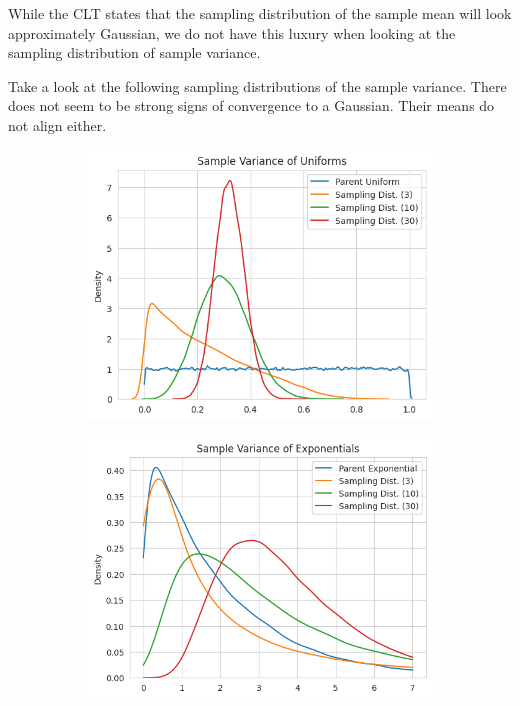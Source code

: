   While the CLT states that the sampling distribution of the sample mean will look approximately Gaussian, we do not have this luxury when looking at the sampling distribution of sample variance. 

  \begin{example}
    Take a look at the following sampling distributions of the sample variance. There does not seem to be strong signs of convergence to a Gaussian. Their means do not align either. 
    \begin{figure}[H]
      \centering
      \begin{subfigure}[b]{0.48\textwidth}
      \centering
        \includegraphics[width=\textwidth]{img/sample_variance_uniform.png}
        \caption{}
        \label{fig:sample_variance_uniform}
      \end{subfigure}
      \hfill 
      \begin{subfigure}[b]{0.48\textwidth}
      \centering
        \includegraphics[width=\textwidth]{img/sample_variance_exp.png}
        \caption{}
        \label{fig:sample_variance_exp}
      \end{subfigure}
      \caption{}
      \label{fig:sample_variance_examples}
    \end{figure}
  \end{example}

